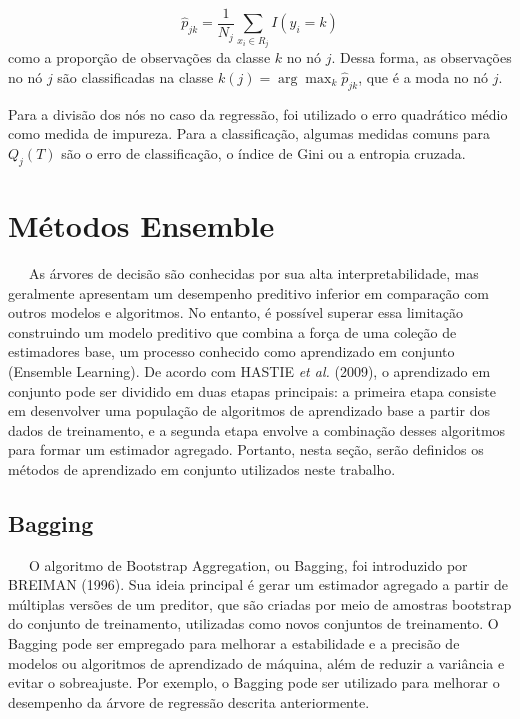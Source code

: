 \documentclass[
  12pt,
  a4paper,
]{scrreprt}
\begin{document}
\[
\hat{p}_{jk} = \frac{1}{N_j}\sum_{x_i \in R_j} I\left(y_i = k\right)
\] como a proporção de observações da classe \(k\) no nó \(j\). Dessa
forma, as observações no nó \(j\) são classificadas na classe
\(k\left(j\right) = \arg \max_{k} \hat{p}_{jk}\), que é a moda no nó
\(j\).

\vspace{12pt}

Para a divisão dos nós no caso da regressão, foi utilizado o erro
quadrático médio como medida de impureza. Para a classificação, algumas
medidas comuns para \(Q_j\left(T\right)\) são o erro de classificação, o
índice de Gini ou a entropia cruzada.

\section{Métodos Ensemble}\label{muxe9todos-ensemble}

~~~As árvores de decisão são conhecidas por sua alta interpretabilidade,
mas geralmente apresentam um desempenho preditivo inferior em comparação
com outros modelos e algoritmos. No entanto, é possível superar essa
limitação construindo um modelo preditivo que combina a força de uma
coleção de estimadores base, um processo conhecido como aprendizado em
conjunto (Ensemble Learning). De acordo com HASTIE \emph{et al.} (2009),
o aprendizado em conjunto pode ser dividido em duas etapas principais: a
primeira etapa consiste em desenvolver uma população de algoritmos de
aprendizado base a partir dos dados de treinamento, e a segunda etapa
envolve a combinação desses algoritmos para formar um estimador
agregado. Portanto, nesta seção, serão definidos os métodos de
aprendizado em conjunto utilizados neste trabalho.

\subsection{Bagging}\label{bagging}

~~~O algoritmo de Bootstrap Aggregation, ou Bagging, foi introduzido por
BREIMAN (1996). Sua ideia principal é gerar um estimador agregado a
partir de múltiplas versões de um preditor, que são criadas por meio de
amostras bootstrap do conjunto de treinamento, utilizadas como novos
conjuntos de treinamento. O Bagging pode ser empregado para melhorar a
estabilidade e a precisão de modelos ou algoritmos de aprendizado de
máquina, além de reduzir a variância e evitar o sobreajuste. Por
exemplo, o Bagging pode ser utilizado para melhorar o desempenho da
árvore de regressão descrita anteriormente.
\end{document}
